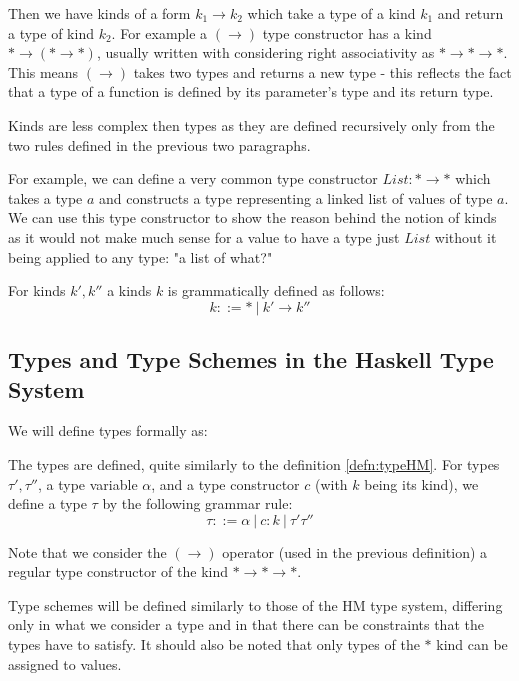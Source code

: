 Then we have kinds of a form $k_1 \rightarrow k_2$ which take a type of a kind $k_1$ and return a type of kind $k_2$. For example a $(\rightarrow)$ type constructor has a kind $* \rightarrow (* \rightarrow *)$, usually written with considering right associativity as $* \rightarrow * \rightarrow *$. This means $(\rightarrow)$ takes two types and returns a new type - this reflects the fact that a type of a function is defined by its parameter's type and its return type.

Kinds are less complex then types as they are defined recursively only from the two rules defined in the previous two paragraphs.

For example, we can define a very common type constructor $List: * \rightarrow *$ which takes a type $a$ and constructs a type representing a linked list of values of type $a$. We can use this type constructor to show the reason behind the notion of kinds as it would not make much sense for a value to have a type just $List$ without it being applied to any type: "a list of what?"

\begin{defn}[Kinds]
    For kinds $k', k''$ a kinds $k$ is grammatically defined as follows:
    $$k ::= *\ |\ k' \rightarrow k''$$
\end{defn}

\subsection{Types and Type Schemes in the Haskell Type System}

We will define types formally as:

\begin{defn}
    The types are defined, quite similarly to the definition \ref{defn:typeHM}. For types $\tau', \tau''$, a type variable $\alpha$, and a type constructor $c$ (with $k$ being its kind), we define a type $\tau$ by the following grammar rule:
    $$\tau ::= \alpha \ |\ c : k\ |\ \tau' \tau''$$

    Note that we consider the $(\rightarrow)$ operator (used in the previous definition) a regular type constructor of the kind $* \rightarrow * \rightarrow *$.
\end{defn}

Type schemes will be defined similarly to those of the HM type system, differing only in what we consider a type and in that there can be constraints that the types have to satisfy. It should also be noted that only types of the $*$ kind can be assigned to values.

